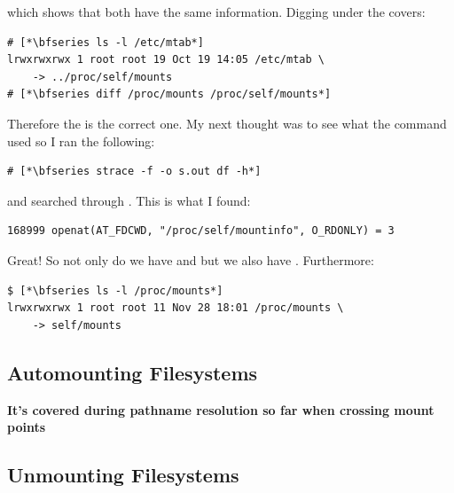 \noindent
which shows that both have the same information. Digging under the covers:

\begin{lstlisting}
# [*\bfseries ls -l /etc/mtab*]
lrwxrwxrwx 1 root root 19 Oct 19 14:05 /etc/mtab \
    -> ../proc/self/mounts
# [*\bfseries diff /proc/mounts /proc/self/mounts*]
\end{lstlisting}

\noindent
Therefore the  is the correct one. My next thought was to see what the  command used so I ran the following:

\begin{lstlisting}
# [*\bfseries strace -f -o s.out df -h*]
\end{lstlisting}

\noindent 
and searched through . This is what I found:

\begin{lstlisting}
168999 openat(AT_FDCWD, "/proc/self/mountinfo", O_RDONLY) = 3
\end{lstlisting}

\noindent
Great! So not only do we have  and  but we also have . Furthermore:

\begin{lstlisting}
$ [*\bfseries ls -l /proc/mounts*]
lrwxrwxrwx 1 root root 11 Nov 28 18:01 /proc/mounts \
    -> self/mounts
\end{lstlisting}



\subsection{Automounting Filesystems}

\textbf{It's covered during pathname resolution so far when crossing mount points}


\subsection{Unmounting Filesystems}

